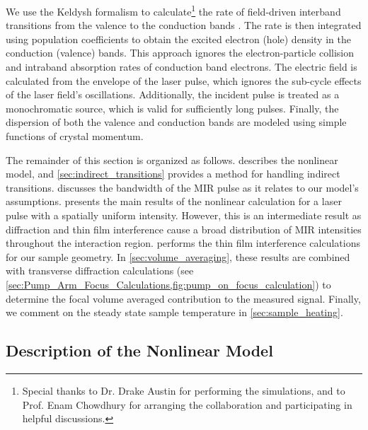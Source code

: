 We use the Keldysh formalism to calculate\footnote{Special thanks to Dr. Drake Austin for performing the simulations, and to Prof. Enam Chowdhury for arranging the collaboration and participating in helpful discussions.} the rate of field-driven interband transitions from the valence to the conduction bands \cite{sergaevaUltrafastExcitationConductionband2018,keldyshIonizationFieldStrong1965,vpopruzhenkoKeldyshTheoryStrong2014}. The rate is then integrated using population coefficients to obtain the excited electron (hole) density in the conduction (valence) bands. This approach ignores the electron-particle collision and intraband absorption rates of conduction band electrons. The electric field is calculated from the envelope of the laser pulse, which ignores the sub-cycle effects of the laser field's oscillations. Additionally, the incident pulse is treated as a monochromatic source, which is valid for sufficiently long pulses. Finally, the dispersion of both the valence and conduction bands are modeled using simple functions of crystal momentum.

The remainder of this section is organized as follows.  describes the nonlinear model, and \cref{sec:indirect_transitions} provides a method for handling indirect transitions.  discusses the bandwidth of the MIR pulse as it relates to our model's assumptions.  presents the main results of the nonlinear calculation for a laser pulse with a spatially uniform intensity. However, this is an intermediate result as diffraction and thin film interference cause a broad distribution of MIR intensities throughout the interaction region.  performs the thin film interference calculations for our sample geometry. In \cref{sec:volume_averaging}, these results are combined with transverse diffraction calculations (see \cref{sec:Pump_Arm_Focus_Calculations,fig:pump_on_focus_calculation}) to determine the focal volume averaged contribution to the measured signal. Finally, we comment on the steady state sample temperature in \cref{sec:sample_heating}.


\subsection{Description of the Nonlinear Model}
\label{sec:nonlinear_excitation_model_details}

